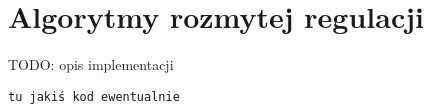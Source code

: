 \chapter{Algorytmy rozmytej regulacji}

TODO: opis implementacji

\begin{verbatim}
tu jakiś kod ewentualnie
\end{verbatim}